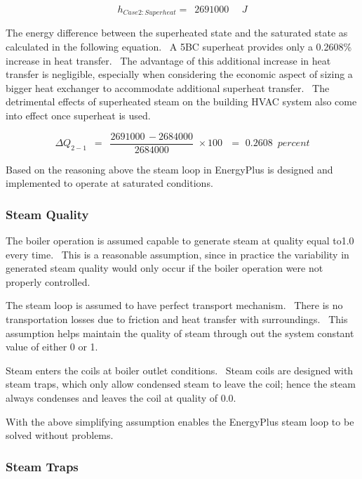 \begin{equation}
{h_{Case2:Superheat}} = \,\,\,2691000\,\,\,\,\,\,\,\,J
\end{equation}

The energy difference between the superheated state and the saturated state as calculated in the following equation.~ A 5BC superheat provides only a 0.2608\% increase in heat transfer.~ The advantage of this additional increase in heat transfer is negligible, especially when considering the economic aspect of sizing a bigger heat exchanger to accommodate additional superheat transfer.~ The detrimental effects of superheated steam on the building HVAC system also come into effect once superheat is used.

\begin{equation}
\Delta {Q_{2 - 1}}\,\,\, = \,\,\,\frac{{2691000\, - 2684000}}{{2684000}}\,\, \times 100\,\,\,\, = \,\,0.2608\,\,\,percent
\end{equation}

Based on the reasoning above the steam loop in EnergyPlus is designed and implemented to operate at saturated conditions.

\subsubsection{Steam Quality}\label{steam-quality}

The boiler operation is assumed capable to generate steam at quality equal to1.0 every time.~ This is a reasonable assumption, since in practice the variability in generated steam quality would only occur if the boiler operation were not properly controlled.

The steam loop is assumed to have perfect transport mechanism.~ There is no transportation losses due to friction and heat transfer with surroundings.~ This assumption helps maintain the quality of steam through out the system constant value of either 0 or 1.

Steam enters the coils at boiler outlet conditions.~ Steam coils are designed with steam traps, which only allow condensed steam to leave the coil; hence the steam always condenses and leaves the coil at quality of 0.0.

With the above simplifying assumption enables the EnergyPlus steam loop to be solved without problems.

\subsubsection{Steam Traps}\label{steam-traps}

